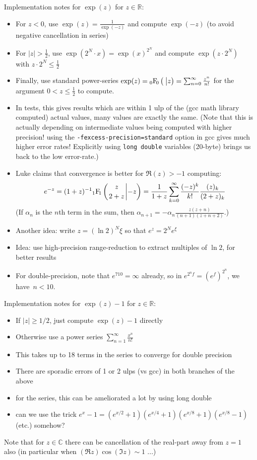 \documentclass[10pt,dvipdfmx,letterpaper,twoside]{article}
\let\O=\operatorname
\newcommand{\RR}{{\mathbb{R}}}
\newcommand{\CC}{{\mathbb{C}}}
\newcommand{\Hyper}[5]{{\mathop{{}_{#1}\!\O{F\!}_{#2}\left({\genfrac{}{}{0pt}{}{#3}{#4}}\middle|{#5}\right)}}}
\newenvironment{implementation}{\noindent\begin{framed}}{\end{framed}}
\let\al=\alpha
\begin{document}
\begin{implementation}
Implementation notes for $\exp(z)$ for $z\in\RR$:
\begin{itemize}
\item For $z<0$, use $\exp(z)=\frac{1}{\exp(-z)}$ and compute $\exp(-z)$ (to avoid negative cancellation in series)
\item For $|z|>\tfrac12$, use $\exp(2^N\cdot x) = \exp(x)^{2^N}$ and compute $\exp(z\cdot 2^N)$ with $z\cdot 2^N\leq\tfrac12$
\item Finally, use standard power-series $\exp(z)=\Hyper{0}{0}{}{}{z} = \sum_{n=0}^\infty\frac{z^n}{n!}$ for the argument $0<z\leq\tfrac12$ to compute.
\item In tests, this gives results which are within 1 ulp of the (gcc math library computed) actual values, many values are exactly the same.
  (Note that this is actually depending on intermediate values being computed with higher precision!  using the {\tt -fexcess-precision=standard} option
  in gcc gives much higher error rates!  Explicitly using {\tt long double} variables (20-byte) brings us back to the low error-rate.)
\item Luke claims that convergence is better for $\Re(z)>-1$ computing:
  \[ e^{-z} = (1+z)^{-1} \Hyper{1}{1}{z}{2+z}{-z} = \frac{1}{1+z}\sum_{k=0}^\infty \frac{(-z)^k}{k!} \frac{(z)_k}{(2+z)_k} \]
  (If $\al_n$ is the $n$th term in the sum, then $\al_{n+1}=-\al_{n}\frac{z(z+n)}{(n+1)(z+n+2)}$.)
\item Another idea: write $z=(\ln2)^N\xi$ so that $e^z=2^N e^\xi$
\item Idea: use high-precision range-reduction to extract multiples of $\ln 2$, for better results
\item For double-precision, note that $e^{710}=\infty$ already, so in $e^{2^n f} = (e^f)^{2^n}$, we have~$n<10$.
\end{itemize}

Implementation notes for $\exp(z)-1$ for $z\in\RR$:
\begin{itemize}
\item If $|z|\geq1/2$, just compute $\exp(z) - 1$ directly
\item Otherwise use a power series $\sum_{n=1}^\infty \frac{x^n}{n!}$
\item This takes up to 18 terms in the series to converge for double precision
\item There are sporadic errors of 1 or 2 ulps (vs gcc) in both branches of the above
\item for the series, this can be ameliorated a lot by using long double
\item can we use the trick $e^x-1 = (e^{x/2}+1)(e^{x/4}+1)(e^{x/8}+1)(e^{x/8}-1)$ (etc.) somehow?
\end{itemize}

Note that for $z\in\CC$ there can be cancellation of the real-part away from $z=1$ also
(in particular when $(\Re z)\cos(\Im z)\sim 1$ ...)
\end{implementation}
\end{document}
